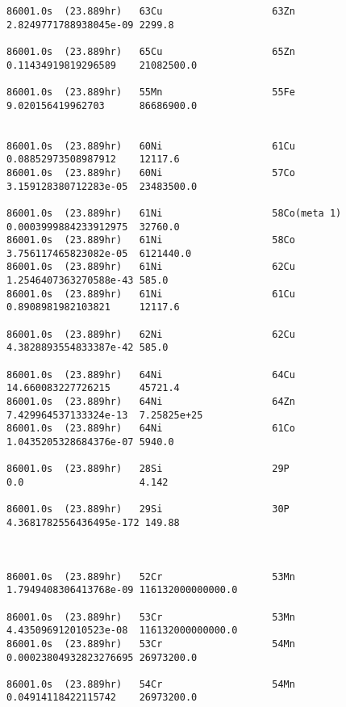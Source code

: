 \begin{lstlisting}[style=sOutputFile,caption={Final results for steel irradiation},label={listing:alexsteel}]
86001.0s  (23.889hr)   63Cu                   63Zn                   2.8249771788938045e-09 2299.8                

86001.0s  (23.889hr)   65Cu                   65Zn                   0.11434919819296589    21082500.0            

86001.0s  (23.889hr)   55Mn                   55Fe                   9.020156419962703      86686900.0            


86001.0s  (23.889hr)   60Ni                   61Cu                   0.08852973508987912    12117.6               
86001.0s  (23.889hr)   60Ni                   57Co                   3.159128380712283e-05  23483500.0            

86001.0s  (23.889hr)   61Ni                   58Co(meta 1)           0.0003999884233912975  32760.0               
86001.0s  (23.889hr)   61Ni                   58Co                   3.756117465823082e-05  6121440.0             
86001.0s  (23.889hr)   61Ni                   62Cu                   1.2546407363270588e-43 585.0                 
86001.0s  (23.889hr)   61Ni                   61Cu                   0.8908981982103821     12117.6               

86001.0s  (23.889hr)   62Ni                   62Cu                   4.3828893554833387e-42 585.0                 

86001.0s  (23.889hr)   64Ni                   64Cu                   14.660083227726215     45721.4               
86001.0s  (23.889hr)   64Ni                   64Zn                   7.429964537133324e-13  7.25825e+25           
86001.0s  (23.889hr)   64Ni                   61Co                   1.0435205328684376e-07 5940.0                

86001.0s  (23.889hr)   28Si                   29P                    0.0                    4.142                 

86001.0s  (23.889hr)   29Si                   30P                    4.3681782556436495e-172 149.88                



86001.0s  (23.889hr)   52Cr                   53Mn                   1.7949408306413768e-09 116132000000000.0     

86001.0s  (23.889hr)   53Cr                   53Mn                   4.435096912010523e-08  116132000000000.0     
86001.0s  (23.889hr)   53Cr                   54Mn                   0.00023804932823276695 26973200.0            

86001.0s  (23.889hr)   54Cr                   54Mn                   0.04914118422115742    26973200.0            



\end{lstlisting}
